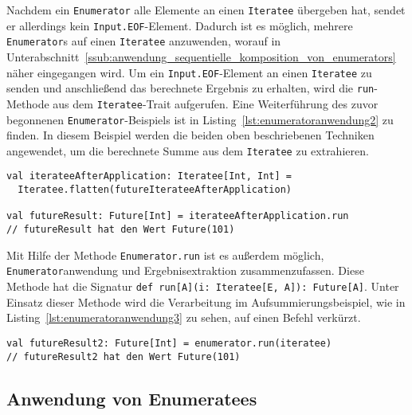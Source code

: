 Nachdem ein \lstinline|Enumerator| alle Elemente an einen \lstinline|Iteratee| übergeben hat, sendet er allerdings kein \lstinline|Input.EOF|-Element.
Dadurch ist es möglich, mehrere \lstinline|Enumerator|s auf einen \lstinline|Iteratee| anzuwenden, worauf in Unterabschnitt~\ref{ssub:anwendung_sequentielle_komposition_von_enumerators} näher eingegangen wird.
Um ein \lstinline|Input.EOF|-Element an einen \lstinline|Iteratee| zu senden und anschließend das berechnete Ergebnis zu erhalten, wird die \lstinline|run|-Methode aus dem \lstinline|Iteratee|-Trait aufgerufen.
Eine Weiterführung des zuvor begonnenen \lstinline|Enumerator|-Beispiels ist in Listing~\ref{lst:enumeratoranwendung2} zu finden.
In diesem Beispiel werden die beiden oben beschriebenen Techniken angewendet, um die berechnete Summe aus dem \lstinline|Iteratee| zu extrahieren.

\begin{lstlisting}[caption=Extrahierung des Ergebnisses aus einem Iteratee, label=lst:enumeratoranwendung2]
val iterateeAfterApplication: Iteratee[Int, Int] =
  Iteratee.flatten(futureIterateeAfterApplication)

val futureResult: Future[Int] = iterateeAfterApplication.run
// futureResult hat den Wert Future(101)
\end{lstlisting}

Mit Hilfe der Methode \lstinline|Enumerator.run| ist es außerdem möglich, \lstinline|Enumerator|anwendung und Ergebnisextraktion zusammenzufassen.
Diese Methode hat die Signatur \lstinline[breaklines=true]|def run[A](i: Iteratee[E, A]): Future[A]|.
Unter Einsatz dieser Methode wird die Verarbeitung im Aufsummierungsbeispiel, wie in Listing~\ref{lst:enumeratoranwendung3} zu sehen, auf einen Befehl verkürzt.

\begin{lstlisting}[caption=Anwendung eines Enumerators mit gleichzeitiger Ergebnisextrahierung, label=lst:enumeratoranwendung3]
val futureResult2: Future[Int] = enumerator.run(iteratee)
// futureResult2 hat den Wert Future(101)
\end{lstlisting}




\subsection{Anwendung von Enumeratees} %
\label{sub:enumeratees}

